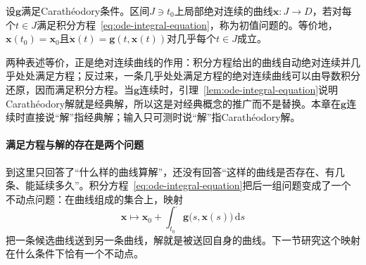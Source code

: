 \begin{definition}[Carathéodory解]
  \label{def:ode-caratheodory-solution}
  设$\bm g$满足Carathéodory条件。区间$J\ni t_0$上局部绝对连续的曲线$\bm x:J\to D$，若对每个$t\in J$满足积分方程~\eqref{eq:ode-integral-equation}，称为初值问题的。等价地，$\bm x(t_0)=\bm x_0$且$\dot{\bm x}(t)=\bm g(t,\bm x(t))$对几乎每个$t\in J$成立。
\end{definition}

两种表述等价，正是绝对连续曲线的作用：积分方程给出的曲线自动绝对连续并几乎处处满足方程；反过来，一条几乎处处满足方程的绝对连续曲线可以由导数积分还原，因而满足积分方程。当$\bm g$连续时，引理~\ref{lem:ode-integral-equation}说明Carathéodory解就是经典解，所以这是对经典概念的推广而不是替换。本章在$\bm g$连续时直接说“解”指经典解；输入只可测时说“解”指Carathéodory解。

\paragraph{满足方程与解的存在是两个问题}
到这里只回答了“什么样的曲线算解”，还没有回答“这样的曲线是否存在、有几条、能延续多久”。积分方程~\eqref{eq:ode-integral-equation}把后一组问题变成了一个不动点问题：在曲线组成的集合上，映射
\[
  \bm x\longmapsto\bm x_0+\int_{t_0}^{\cdot}\bm g\bigl(s,\bm x(s)\bigr)\,\mathrm ds
\]
把一条候选曲线送到另一条曲线，解就是被送回自身的曲线。下一节研究这个映射在什么条件下恰有一个不动点。

